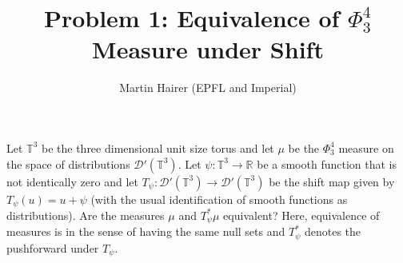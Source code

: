 

\title{Problem 1: Equivalence of $\Phi^4_3$ Measure under Shift}
\author{Martin Hairer (EPFL and Imperial)}
\date{}


\maketitle

Let $\mathbb{T}^3$ be the three dimensional unit size torus and let $\mu$ be the $\Phi^4_3$ measure on the space of distributions $\mathcal{D}'(\mathbb{T}^3)$. Let $\psi : \mathbb{T}^3 \to \mathbb{R}$ be a smooth function that is not identically zero and let $T_\psi : \mathcal{D}'(\mathbb{T}^3) \to \mathcal{D}'(\mathbb{T}^3)$ be the shift map given by $T_\psi(u) = u + \psi$ (with the usual identification of smooth functions as distributions). Are the measures $\mu$ and $T_\psi^* \mu$ equivalent? Here, equivalence of measures is in the sense of having the same null sets and $T_\psi^*$ denotes the pushforward under $T_\psi$.


